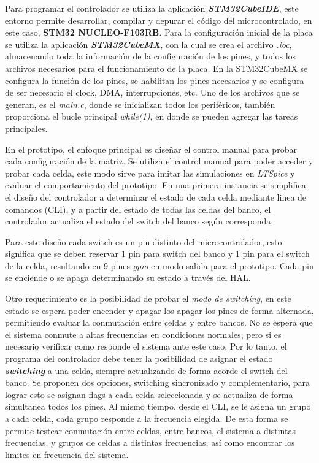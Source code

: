 Para programar el controlador se utiliza la aplicación \textbf{\textit{STM32CubeIDE}}, este entorno permite desarrollar, compilar y depurar el código del microcontrolado, en este caso, \textbf{STM32 NUCLEO-F103RB}. Para la configuración inicial de la placa se utiliza la aplicación \textbf{\textit{STM32CubeMX}}, con la cual se crea el archivo \textit{.ioc}, almacenando toda la información de la configuración de los pines, y todos los archivos necesarios para el funcionamiento de la placa. En la STM32CubeMX
se configura la función de los pines, se habilitan los pines necesarios y se configura de ser necesario el clock, DMA, interrupciones, etc. Uno de los archivos que se generan, es el \textit{main.c}, donde se inicializan todos los periféricos, también proporciona el bucle principal \textit{while(1)}, en donde se pueden agregar las tareas principales.

 En el prototipo, el enfoque principal es diseñar el control manual para probar cada configuración de la matriz. Se utiliza el control manual para poder acceder y probar cada celda, este modo sirve para imitar las simulaciones en \textit{LTSpice} y evaluar el comportamiento del prototipo. 
 En una primera instancia se simplifica el diseño del controlador a determinar el estado de cada celda mediante linea de comandos (CLI), y a partir del estado de todas las celdas del banco, el controlador actualiza el estado del switch del banco según corresponda.
 
 Para este diseño cada switch es un pin distinto del microcontrolador, esto significa que se deben reservar 1 pin para switch del banco y 1 pin para el switch de la celda, resultando en 9 pines \textit{gpio} en modo salida para el prototipo. Cada pin se enciende o se apaga determinando su estado a través del HAL.
 

Otro requerimiento es la posibilidad de probar el \textit{modo de switching}, en este estado se espera poder encender y apagar los apagar los pines de forma alternada, permitiendo evaluar la conmutación entre celdas y entre bancos. No se espera que el sistema conmute a altas frecuencias en condiciones normales, pero si es necesario verificar como responde el sistema ante este caso. Por lo tanto, el programa del controlador debe tener la posibilidad de asignar el estado \textbf{\textit{switching}} a una celda, siempre actualizando de forma acorde el switch del banco. Se proponen dos opciones, switching sincronizado y complementario, para lograr esto se asignan flags a cada celda seleccionada y se actualiza de forma simultanea todos los pines. Al mismo tiempo, desde el CLI, se le asigna un grupo a cada celda, cada grupo responde a la frecuencia elegida. De esta forma se permite testear conmutación entre celdas, entre bancos, el sistema a distintas frecuencias, y grupos de celdas a distintas frecuencias, así como encontrar los limites en frecuencia del sistema.

